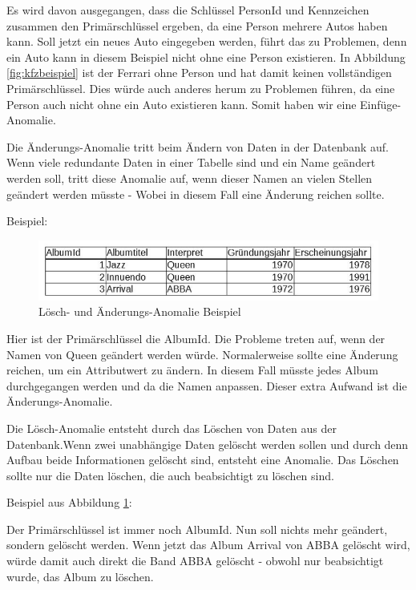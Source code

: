 Es wird davon ausgegangen, dass die Schlüssel PersonId und Kennzeichen zusammen den Primärschlüssel ergeben, da eine Person mehrere Autos haben kann. Soll jetzt ein neues Auto eingegeben werden, führt das zu Problemen, denn ein Auto kann in diesem Beispiel nicht ohne eine Person existieren. In Abbildung \ref{fig:kfzbeispiel} ist der Ferrari ohne Person und hat damit keinen vollständigen Primärschlüssel. Dies würde auch anderes herum zu Problemen führen, da eine Person auch nicht ohne ein Auto existieren kann. Somit haben wir eine Einfüge-Anomalie.

Die Änderungs-Anomalie tritt beim Ändern von Daten in der Datenbank auf. Wenn 
viele redundante Daten in einer Tabelle sind und ein Name geändert werden soll, tritt diese Anomalie auf, wenn dieser Namen an vielen Stellen geändert werden müsste - Wobei in diesem Fall eine Änderung reichen sollte.

Beispiel:
\begin{figure}[!htb]
	\centering
	\includegraphics[width=13cm,keepaspectratio]{bilder/AlbumBeispiel}
	\caption{Lösch- und Änderungs-Anomalie Beispiel}
	\label{fig:albumbeispiel}
\end{figure}

Hier ist der Primärschlüssel die AlbumId. Die Probleme treten auf, wenn der Namen von Queen geändert werden würde. Normalerweise sollte eine Änderung reichen, um ein Attributwert zu ändern. In diesem Fall müsste jedes Album durchgegangen werden und da die Namen anpassen. Dieser extra Aufwand ist die Änderungs-Anomalie.

Die Lösch-Anomalie entsteht durch das Löschen von Daten aus der Datenbank.Wenn zwei unabhängige Daten gelöscht werden sollen und durch denn Aufbau beide Informationen gelöscht sind, entsteht eine Anomalie. Das Löschen sollte nur die Daten löschen, die auch beabsichtigt zu löschen sind. 

Beispiel aus Abbildung \ref{fig:albumbeispiel}:

Der Primärschlüssel ist immer noch AlbumId. Nun soll nichts mehr geändert, sondern gelöscht werden. Wenn jetzt das Album Arrival von ABBA gelöscht wird, würde damit auch direkt die Band ABBA gelöscht - obwohl nur beabsichtigt wurde, das Album zu löschen. 

